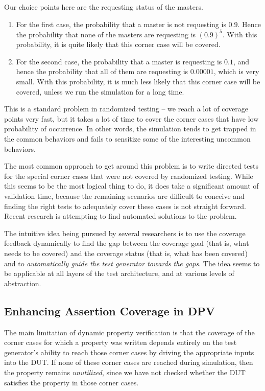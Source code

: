 \noindent
Our choice points here are the requesting status of the masters.
\begin{enumerate}

\item For the first case, the probability that a master is not requesting
    is $0.9$. Hence the probability that none of the masters are 
	requesting is $(0.9)^5$. With this probability,
    it is quite likely that this corner case will be covered.

\item For the second case, the probability that a master is requesting is
    $0.1$, and hence the probability that all of them are requesting is
    $0.00001$, which is very small. With this probability, it is much
    less likely that this corner case will be covered, unless we run the
    simulation for a long time.

\end{enumerate}
\noindent
This is a standard problem in randomized testing -- we reach a lot of coverage
points very fast, but it takes a lot of time to cover the corner cases that
have low probability of occurrence. In other words, the simulation tends to
get trapped in the common behaviors and fails to sensitize some of the
interesting uncommon behaviors. 

\noindent
The most common approach to get around this problem is to write
directed tests for the special corner cases that were not covered by
randomized testing. While this seems to be the most logical thing to do, it
does take a significant amount of validation time, because the remaining
scenarios are difficult to conceive and finding the right tests to adequately
cover these cases is not straight forward. Recent research is attempting to
find automated solutions to the problem. 

\noindent
The intuitive idea being pursued by several researchers is to use the
coverage feedback dynamically to find the gap between the coverage goal
(that is, what needs to be covered) and the coverage status (that is,
what has been covered) and to {\em automatically guide the test generator
towards the gaps}. The idea seems to be applicable at all layers of the test
architecture, and at various levels of abstraction. 

\subsection{Enhancing Assertion Coverage in DPV}
\noindent
The main limitation of dynamic property verification is that the coverage of
the corner cases for which a property was written depends entirely on the test
generator's ability to reach those corner cases by driving the appropriate
inputs into the DUT. If none of these corner cases are reached during
simulation, then the property remains {\em unutilized}, since we have not
checked whether the DUT satisfies the property in those corner cases.

